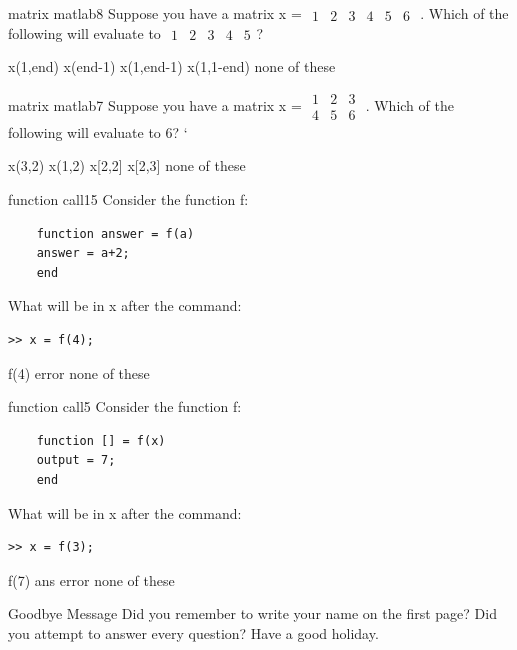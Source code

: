 \documentclass{exam}
\begin{document}
\begin{problem}[requires=matrix matlab]{matrix matlab}{8}
  Suppose you have a matrix x = \footnotesize
  $\begin{array}{cccccc}1 & 2 & 3 & 4 & 5 & 6 \end{array}$
  \normalsize. Which of the following will evaluate to \footnotesize
  $\begin{array}{cccccc}1 & 2 & 3 & 4 & 5 \end{array}$\normalsize?
  \begin{answers}   
    \answer x(1,end)  
    \answer x(end-1)  
    \answer[correct] x(1,end-1) %
    \answer x(1,1-end)
    \answer[fixed] none of these %
  \end{answers}
\end{problem}

\begin{problem}[requires=matrix matlab]{matrix matlab}{7}
  Suppose you have a matrix x = \footnotesize
  $\begin{array}{ccc}1 & 2 & 3 \\4 & 5 & 6 \end{array}$
  \normalsize. Which of the following will evaluate to 6?
`  \begin{answers}   
    \answer x(3,2)
    \answer x(1,2)
    \answer x[2,2]
    \answer x[2,3] 
     none of these %
  \end{answers}
\end{problem}

\begin{problem}{function call}{15}
  Consider the function f:
  \begin{verbatim}
    function answer = f(a)
    answer = a+2;
    end
  \end{verbatim}
  What will be in x after the command:
  \begin{verbatim}>> x = f(4);
  \end{verbatim}
  \begin{answers}
    \answer f(4)
    \answer[fixed] error %
    \answer[fixed] none of these %
  \end{answers}
\end{problem}

\begin{problem}{function call}{5}
  Consider the function f:
  \begin{verbatim}
    function [] = f(x)
    output = 7;
    end
  \end{verbatim}
  What will be in x after the command:
  \begin{verbatim}>> x = f(3);\end{verbatim}
  \begin{answers}
    \answer f(7)
    \answer ans
     error %
    \answer[fixed] none of these %
  \end{answers}
\end{problem}

\begin{block}{Goodbye Message}
  Did you remember to write your name on the first page?  Did you
  attempt to answer every question?    Have a good holiday.
\end{block}
\end{document}
